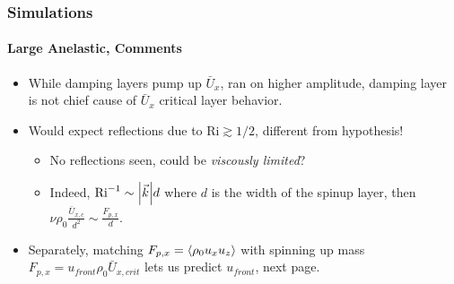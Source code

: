 \documentclass[dvipsnames, 10pt]{beamer}
\DeclarePairedDelimiter\abs{\lvert}{\rvert}
\DeclarePairedDelimiter\ev{\langle}{\rangle}
\begin{document}
\begin{frame}
    \frametitle{Simulations}
    \framesubtitle{Large Anelastic, Comments}

    \begin{itemize}
        \item While damping layers pump up $\bar{U}_x$, ran on higher amplitude,
            damping layer is not chief cause of $\bar{U}_x$ critical layer
            behavior. %

        \item Would expect reflections due to $\mathrm{Ri} \gtrsim 1/2$,
            different from hypothesis!
            \begin{itemize}
                \item No reflections seen, could be \emph{viscously limited}?

                \item Indeed, $\mathrm{Ri}^{-1} \sim \abs*{\vec{k}}d$ where $d$
                    is the width of the spinup layer, then $\nu \rho_0
                    \frac{\bar{U}_{x, c}}{d^2} \sim \frac{F_{p, x}}{d}$.
            \end{itemize}

        \item Separately, matching $F_{p, x} = \ev*{\rho_0 u_x u_z}$ with
            spinning up mass $F_{p, x} = u_{front} \rho_0 \bar{U}_{x, crit}$
            lets us predict $u_{front}$, next page.
    \end{itemize}
\end{frame}
\end{document}
